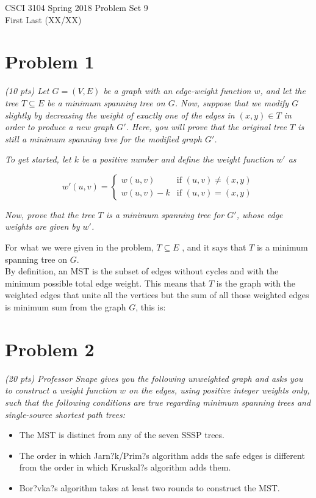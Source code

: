 \documentclass[12pt]{article} \setlength{\oddsidemargin}{0in}
\begin{document}
\noindent CSCI 3104 Spring 2018 \hfill Problem Set 9\\
First Last (XX/XX)

\graphicspath{ {\string~/Desktop/images/} }

\hrulefill

{\selectfont}

\section*{Problem 1}

\textit{(10 pts) Let $G = (V, E)$ be a graph with an edge-weight function $w$, and let the tree
$T \subseteq E$ be a minimum spanning tree on $G$. Now, suppose that we modify $G$ slightly by
decreasing the weight of exactly one of the edges in $(x, y) \in T$ in order to produce a
new graph $G'$. Here, you will prove that the original tree $T$ is still a minimum spanning
tree for the modified graph $G'$.}

\textit{To get started, let $k$ be a positive number and define the weight function $w'$ as}

$$
w'(u,v) =
  \begin{cases}
    w(u,v) & \text{if $(u,v) \ne (x,y)$} \\
    w(u,v)-k & \text{if $(u,v) = (x,y)$}
  \end{cases}
  $$

\textit{Now, prove that the tree $T$ is a minimum spanning tree for $G'$, whose edge weights are
given by $w'$.}

For what we were given in the problem, $T \subseteq E$ , and it says that $T$ is a minimum spanning tree on $G$. \\
By definition, an MST is the subset of edges without cycles and with the minimum possible total edge weight. This means that $T$ is the graph with the weighted edges that unite all the vertices but the sum of all those weighted edges is minimum sum from the graph $G$, this is: 

\newpage

\section*{Problem 2}

\textit{(20 pts) Professor Snape gives you the following unweighted graph and asks you to
construct a weight function $w$ on the edges, using positive integer weights only, such
that the following conditions are true regarding minimum spanning trees and single-source shortest path trees:}
\begin{itemize}
\item The MST is distinct from any of the seven SSSP trees.
\item The order in which Jarn?k/Prim?s algorithm adds the safe edges is different from the order in which Kruskal?s algorithm adds them.
\item Bor?vka?s algorithm takes at least two rounds to construct the MST.
\end{itemize}
\end{document}
